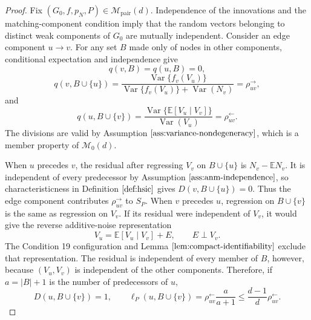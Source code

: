 \documentclass{article}
\begin{document}
\begin{proof}
Fix \((G_0,f,p_N,P)\in\mathcal M_{\mathrm{pair}}(d)\).  Independence of the innovations and the matching-component condition imply that the random vectors belonging to distinct weak components of \(G_0\) are mutually independent.  Consider an edge component \(u\to v\).  For any set \(B\) made only of nodes in other components, conditional expectation and independence give
\[
 q(v,B)=q(u,B)=0,
\]
\[
 q(v,B\cup\{u\})
 =\frac{\operatorname{Var}\{f_v(V_u)\}}
 {\operatorname{Var}\{f_v(V_u)\}+\operatorname{Var}(N_v)}
 =\rho^{\to}_{uv},
\]
and
\[
 q(u,B\cup\{v\})
 =\frac{\operatorname{Var}\{\mathbb E[V_u\mid V_v]\}}
 {\operatorname{Var}(V_u)}
 =\rho^{\leftarrow}_{uv}.
\]
The divisions are valid by Assumption \(\ref{ass:variance-nondegeneracy}\), which is a member property of \(\mathcal M_0(d)\).

When \(u\) precedes \(v\), the residual after regressing \(V_v\) on \(B\cup\{u\}\) is \(N_v-\mathbb E N_v\).  It is independent of every predecessor by Assumption \(\ref{ass:anm-independence}\), so characteristicness in Definition \(\ref{def:hsic}\) gives \(D(v,B\cup\{u\})=0\).  Thus the edge component contributes \(\rho^{\to}_{uv}\) to \(S_P\).  When \(v\) precedes \(u\), regression on \(B\cup\{v\}\) is the same as regression on \(V_v\).  If its residual were independent of \(V_v\), it would give the reverse additive-noise representation
\[
 V_u=\mathbb E[V_u\mid V_v]+E,
 \qquad E\perp V_v.
\]
The Condition 19 configuration and Lemma \(\ref{lem:compact-identifiability}\) exclude that representation.  The residual is independent of every member of \(B\), however, because \((V_u,V_v)\) is independent of the other components.  Therefore, if \(a=|B|+1\) is the number of predecessors of \(u\),
\[
 D(u,B\cup\{v\})=1,
 \qquad
 \ell_P(u,B\cup\{v\})
 =\rho^{\leftarrow}_{uv}\frac{a}{a+1}
 \le \frac{d-1}{d}\rho^{\leftarrow}_{uv}.
\]


\end{proof}
\end{document}
